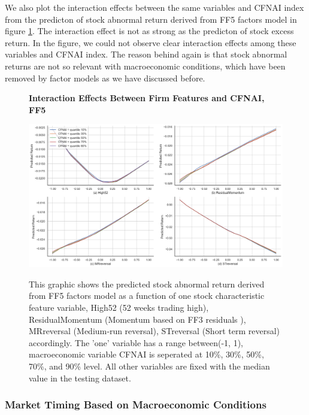 We also plot the interaction effects between the same variables and CFNAI index from the predicton of stock abnormal return derived from FF5 factors model in figure \ref{fig: interaction effect_ff5}. The interaction effect is not as strong as the predicton of stock excess return. In the figure, we could not observe clear interaction effects among these variables and CFNAI index. The reason behind again is that stock abnormal returns are not so relevant with macroeconomic conditions, which have been removed by factor models as we have discussed before.

\begin{figure}[H]
  \centering
  \caption{\textbf{Interaction Effects Between Firm Features and CFNAI, FF5}}
  \includegraphics[width=.8\textwidth]{images/interactive_effect_ff5.png}
  \label{fig: interaction effect_ff5}
  \caption*{\footnotesize{This graphic shows the predicted stock abnormal return derived from FF5 factors model as a function of one stock characteristic feature variable, High52 (52 weeks trading high), ResidualMomentum (Momentum based on FF3 residuals  ), MRreversal (Medium‐run reversal), STreversal (Short term reversal) accordingly. The 'one' variable has a range between(-1, 1), macroeconomic variable CFNAI is seperated at 10\%, 30\%, 50\%, 70\%, and 90\% level. All other variables are fixed with the median value in the testing dataset.}}
\end{figure}

\subsubsection{Market Timing Based on Macroeconomic Conditions}

